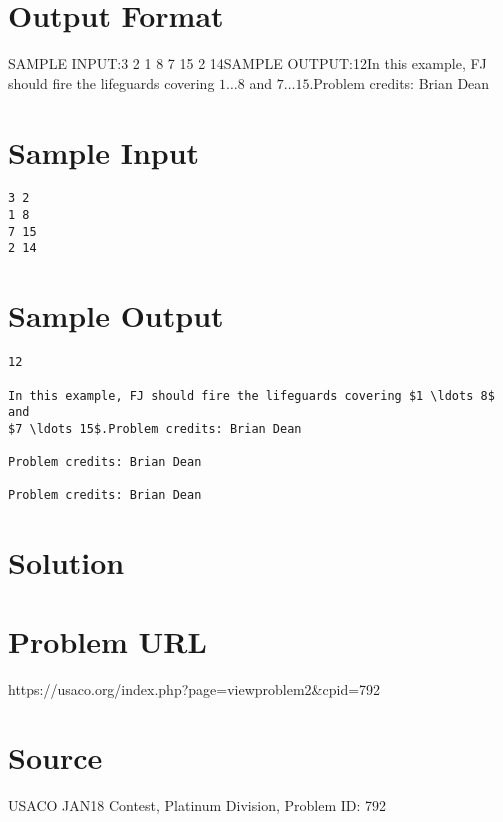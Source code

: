\documentclass[12pt]{article}
\begin{document}
\section*{Output Format}
SAMPLE INPUT:3 2
1 8
7 15
2 14SAMPLE OUTPUT:12In this example, FJ should fire the lifeguards covering $1 \ldots 8$ and
$7 \ldots 15$.Problem credits: Brian Dean

\section*{Sample Input}
\begin{verbatim}
3 2
1 8
7 15
2 14
\end{verbatim}

\section*{Sample Output}
\begin{verbatim}
12

In this example, FJ should fire the lifeguards covering $1 \ldots 8$ and
$7 \ldots 15$.Problem credits: Brian Dean

Problem credits: Brian Dean

Problem credits: Brian Dean
\end{verbatim}

\section*{Solution}


\section*{Problem URL}
https://usaco.org/index.php?page=viewproblem2&cpid=792

\section*{Source}
USACO JAN18 Contest, Platinum Division, Problem ID: 792
\end{document}

